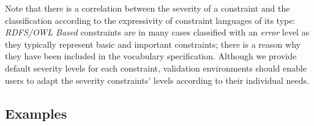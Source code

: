 \documentclass[conference]{IEEEtran}
\newcommand{\tb}[1]{\todo[size=\small, color=green!40]{\textbf{Thomas:} #1}}
\begin{document}
Note that there is a correlation between the severity of a constraint and the classification according to the expressivity of constraint languages of its type: \emph{RDFS/OWL Based} constraints are in many cases classified with an \emph{error} level as they typically represent basic and important constraints; there is a reason why they have been included in the vocabulary specification. Although we provide default severity levels for each constraint, validation environments should enable users to adapt the severity constraints' levels according to their individual needs.

%
%
%

%


\subsection{Examples}
\label{vocabulary-constraint-types}
\end{document}
